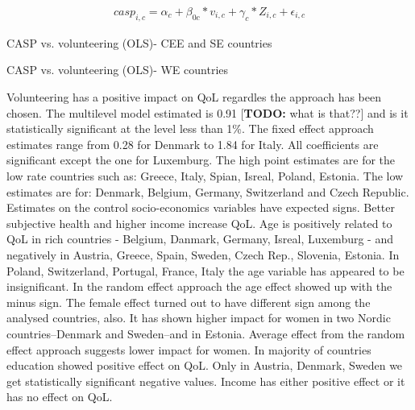 \documentclass[10pt, letterpaper]{article}
\begin{document}
\begin{spacing}{1.4}
  \begin{eqnarray}
	casp_{i,c}= \alpha_{c}+ \beta_{0c}*v_{i,c} + \gamma_{c}*Z_{i,c} + \epsilon_{i,c}
 \end{eqnarray}


\begin{spacing}{.9}
\begin{table}[H]
\centering 
\caption{CASP vs. volunteering (OLS)- CEE and SE countries}  
\begin{small} 
	 
      \label{pooling} 
\end{small}
\end{table}
\end{spacing}

\begin{spacing}{.9}
\begin{table}[H]
\centering 
\caption{CASP vs. volunteering (OLS)- WE countries}  
\begin{small} 
	 
      \label{pooling} 
\end{small}
\end{table}
\end{spacing}

Volunteering has a positive impact on QoL regardles the approach has been chosen. The multilevel model estimated is 0.91 [{\bf TODO:} what is that??] and is it statistically significant at the level less than 1\%. The fixed effect approach estimates range from 0.28 for Denmark to 1.84 for Italy. All coefficients are significant except the one for Luxemburg. The high point estimates are for the low rate countries such as: Greece, Italy, Spian, Isreal, Poland, Estonia. The low estimates are for: Denmark, Belgium, Germany, Switzerland and Czech Republic. \\

Estimates on the control socio-economics variables have expected signs. Better subjective health and higher income increase QoL. Age is positively related to QoL in rich countries - Belgium, Danmark, Germany, Isreal, Luxemburg - and negatively in Austria, Greece, Spain, Sweden, Czech Rep.,  Slovenia, Estonia. In Poland, Switzerland, Portugal, France, Italy the age variable has appeared to be insignificant. In the random effect approach the age effect  showed up with the minus sign. The female effect turned out to have different sign among the analysed countries, also.  It has shown higher impact for women in two Nordic countries--Denmark and Sweden--and in Estonia. Average effect from the random effect approach suggests lower impact for women. In majority of countries education showed positive effect on QoL. Only in Austria, Denmark, Sweden we get statistically significant negative values. Income has either positive effect or it has no effect on QoL. \\ 


\end{spacing}
\end{document}
